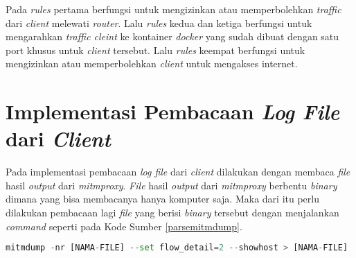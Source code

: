 Pada \textit{rules} pertama berfungsi untuk mengizinkan atau memperbolehkan \textit{traffic} dari \textit{client} melewati \textit{router}. Lalu \textit{rules} kedua dan ketiga berfungsi untuk mengarahkan \textit{traffic cleint} ke kontainer \textit{docker} yang sudah dibuat dengan satu port khusus untuk \textit{client} tersebut. Lalu \textit{rules} keempat berfungsi untuk mengizinkan atau memperbolehkan \textit{client} untuk mengakses internet.

\section{Implementasi Pembacaan \textit{Log File} dari \textit{Client}}
Pada implementasi pembacaan \textit{log file} dari \textit{client} dilakukan dengan membaca \textit{file} hasil \textit{output} dari \textit{mitmproxy}. \textit{File} hasil \textit{output} dari \textit{mitmproxy} berbentu \textit{binary} dimana yang bisa membacanya hanya komputer saja. Maka dari itu perlu dilakukan pembacaan lagi \textit{file} yang berisi \textit{binary} tersebut dengan menjalankan \textit{command} seperti pada Kode Sumber \ref{parsemitmdump}.\\
\begin{minipage}{\linewidth}
\begin{lstlisting}[caption=Perintah untuk Membaca \textit{File Log} dari \textit{Mitmproxy},language=Python,label=parsemitmdump]
mitmdump -nr [NAMA-FILE] --set flow_detail=2 --showhost > [NAMA-FILE]
\end{lstlisting}
\end{minipage}